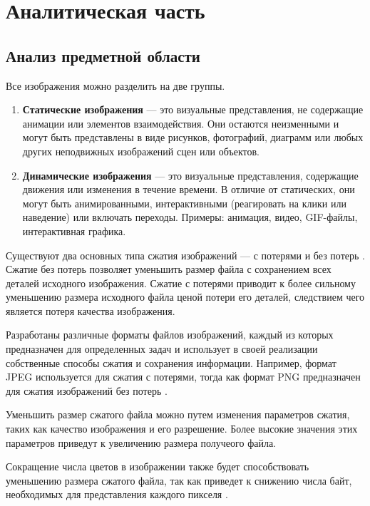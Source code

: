 \chapter{Аналитическая часть}

\section{Анализ предметной области}

Все изображения можно разделить на две группы.
\begin{enumerate}
    \item \textbf{Статические изображения} --- это визуальные представления, не содержащие анимации или элементов взаимодействия. Они остаются неизменными и могут быть представлены в виде рисунков, фотографий, диаграмм или любых других неподвижных изображений сцен или объектов.
    \item \textbf{Динамические изображения} --- это визуальные представления, содержащие движения или изменения в течение времени. В отличие от статических, они могут быть анимированными, интерактивными (реагировать на клики или наведение) или включать переходы. Примеры: анимация, видео, GIF-файлы, интерактивная графика.
\end{enumerate}

Существуют два основных типа сжатия изображений --- с потерями и без потерь \cite{book-1}. Сжатие без потерь позволяет уменьшить размер файла с сохранением всех деталей исходного изображения. Сжатие с потерями приводит к более сильному уменьшению размера исходного файла ценой потери его деталей, следствием чего является потеря качества изображения.

Разработаны различные форматы файлов изображений, каждый из которых предназначен для определенных задач и использует в своей реализации собственные способы сжатия и сохранения информации. Например, формат JPEG используется для сжатия с потерями, тогда как формат PNG предназначен для сжатия изображений без потерь \cite{book-2}.

Уменьшить размер сжатого файла можно путем изменения параметров сжатия, таких как качество изображения и его разрешение. Более высокие значения этих параметров приведут к увеличению размера получеого файла.

Сокращение числа цветов в изображении также будет способствовать уменьшению размера сжатого файла, так как приведет к снижению числа байт, необходимых для представления каждого пикселя \cite{article-algorithms}.


